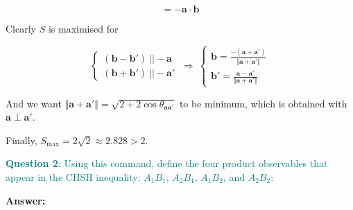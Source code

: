 \documentclass[11pt,dvipsnames]{article}
\begin{document}
$$
= -\mathbf{a}\cdot\mathbf{b}
$$

Clearly $S$ is maximised for

$$
\begin{cases}
(\mathbf{b}-\mathbf{b'})\ ||-\mathbf{a} \\[1em]
(\mathbf{b}+\mathbf{b'})\ ||-\mathbf{a'}
\end{cases}
\ \Rightarrow\ 
\begin{cases}
\mathbf{b}  = \frac{-(\mathbf{a}+\mathbf{a'})}{\Vert\mathbf{a}+\mathbf{a'}\Vert} \\[1em]
\mathbf{b'} = \frac{\mathbf{a}-\mathbf{a'}}{\Vert\mathbf{a}+\mathbf{a'}\Vert} 
\end{cases}
$$

And we want $\Vert\mathbf{a}+\mathbf{a'}\Vert=\sqrt{2+2\cos\theta_{\mathbf{a}\mathbf{a'}}}$ to be minimum, which is obtained with $\mathbf{a}\perp\mathbf{a'}$.

Finally, $S_{\max}=2\sqrt{2}\approx2.828>2$.

\textcolor{teal}{\textbf{Question 2}: Using this command,
define the four product observables that appear in the CHSH inequality:
\(A_1B_1\), \(A_2B_1\), \(A_1B_2\), and \(A_2B_2\):}


\textbf{Answer:}
\end{document}
